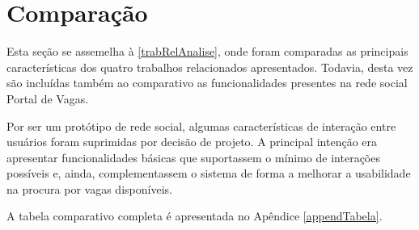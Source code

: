 \section{Comparação}
\label{redeComparacao}

Esta seção se assemelha à \ref{trabRelAnalise}, onde foram comparadas as principais características dos quatro  trabalhos relacionados apresentados. Todavia, desta vez são incluídas também ao comparativo as funcionalidades presentes na rede social Portal de Vagas.

Por ser um protótipo de rede social, algumas características de interação entre usuários foram suprimidas por decisão de projeto. A principal intenção era apresentar funcionalidades básicas que suportassem o mínimo de interações possíveis e, ainda, complementassem o sistema de forma a melhorar a usabilidade na procura por vagas disponíveis.

A tabela comparativo completa é apresentada no Apêndice \ref{appendTabela}.